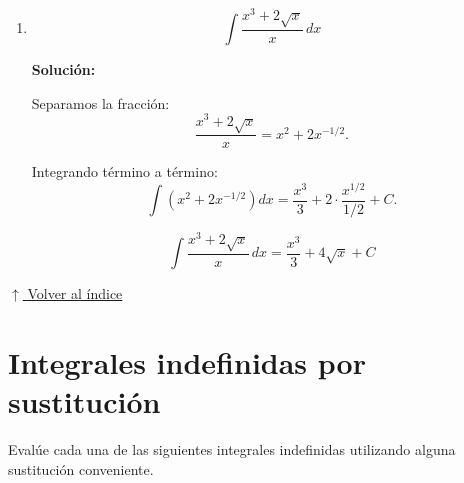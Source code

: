 \documentclass[12pt]{article}
\newcommand{\solucion}{%
    \vspace{0.8em}%
    \textbf{Solución:}%
}
\newcommand{\volverindice}{%
    \vspace{1em}%
    \begin{flushright}%
        \hyperlink{indice}{\small $\uparrow$ Volver al índice}%
    \end{flushright}%
}
\begin{document}
\begin{enumerate}[label=\alph*.-]
    \solucion

    Por la identidad pitagórica $1+\tan^2\theta=\sec^2\theta$, resulta
    \[
    \int\left(1+\tan^2\theta\right)d\theta=\int\sec^2\theta\,d\theta=\tan\theta+C.
    \]

    \[
    \boxed{
    \int\left(1+\tan^2\theta\right)d\theta=\tan\theta+C
    }
    \]


    \item
    \[
    \int\frac{x^3+2\sqrt{x}}{x}\,dx
    \]

    \solucion

    Separamos la fracción:
    \[
    \frac{x^3+2\sqrt{x}}{x}=x^2+2x^{-1/2}.
    \]

    Integrando término a término:
    \[
    \int\left(x^2+2x^{-1/2}\right)dx
    =\frac{x^3}{3}+2\cdot\frac{x^{1/2}}{1/2}+C.
    \]

    \[
    \boxed{
    \int\frac{x^3+2\sqrt{x}}{x}\,dx=\frac{x^3}{3}+4\sqrt{x}+C
    }
    \]

\end{enumerate}

\volverindice
\newpage


\section{Integrales indefinidas por sustitución}

Evalúe cada una de las siguientes integrales indefinidas utilizando
alguna sustitución conveniente.
\end{document}

